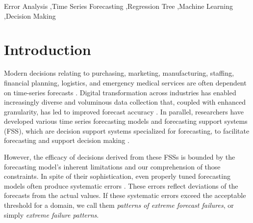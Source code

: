 \documentclass[preprint,12pt]{elsarticle}
\begin{document}


\begin{keyword}
Error Analysis \sep Time Series Forecasting \sep Regression Tree \sep Machine Learning \sep Decision Making
\end{keyword} 

\maketitle


\section{Introduction}\label{sec:Intro}
Modern decisions relating to purchasing, marketing, manufacturing, staffing, financial planning, logistics, and emergency medical services are often dependent on time-series forecasts \citep{abreu2023, fildes2006}. Digital transformation across industries has enabled increasingly diverse and voluminous data collection that, coupled with enhanced granularity, has led to improved forecast accuracy \citep{chae2024}. In parallel, researchers have developed various time series forecasting models and forecasting support systems (FSS), which are decision support systems specialized for forecasting, to facilitate forecasting and support decision making \citep{asimakopoulos2013, fildes2006, petropoulos2022}. 

However, the efficacy of decisions derived from these FSSs is bounded by the forecasting model’s inherent limitations and our comprehension of those constraints. In spite of their sophistication, even properly tuned forecasting models often produce systematic errors \citep{eyuboglu2022}. These errors reflect deviations of the forecasts from the actual values. If these systematic errors exceed the acceptable threshold for a domain, we call them \emph{patterns of extreme forecast failures}, or simply %
\emph{extreme failure patterns}.
\end{document}

